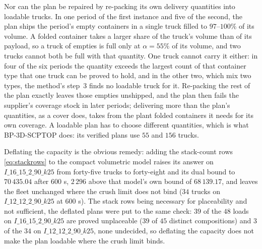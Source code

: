 Nor can the plan be repaired by re-packing its own delivery quantities
into loadable trucks. In one period of the first instance and five of
the second, the plan ships the period's empty containers in a single
truck filled to $97$--$100\%$ of its volume. A folded container takes a
larger share of the truck's volume than of its payload, so a truck of
empties is full only at $\alpha = 55\%$ of its volume, and two trucks
cannot both be full with that quantity. One truck cannot carry it either: in
four of the six periods the quantity exceeds the largest count of that
container type that one truck can be proved to hold, and in the other
two, which mix two types, the method's step~3 finds no loadable truck
for it. Re-packing the rest of the plan exactly leaves those empties
unshipped, and the plan then fails the supplier's coverage stock in
later periods; delivering more than the plan's quantities, as a cover
does, takes from the plant folded containers it needs for its own
coverage. A loadable plan has to choose different quantities, which is
what BP-3D-SCPTOP does: its verified plans use $55$ and $156$ trucks.

Deflating the capacity is the obvious remedy: adding the stack-count
rows \eqref{eq:stackrows} to the compact volumetric model raises its
answer on $I\_16\_15\_2\_90\_k25$ from forty-five trucks to forty-eight
and its dual bound to $70\,435.04$ after $600$ s, $2\,296$ above that
model's own bound of $68\,139.17$, and leaves the fleet unchanged where
the crush limit does not bind ($34$ trucks on $I\_12\_12\_2\_90\_k25$ at
$600$ s).
The stack rows being necessary for placeability and not sufficient,
the deflated plans were put to the same check: $39$ of the $48$ loads
on $I\_16\_15\_2\_90\_k25$ are proved unplaceable ($39$ of $45$
distinct compositions) and $3$ of the $34$ on $I\_12\_12\_2\_90\_k25$,
none undecided, so deflating the capacity does not make the plan
loadable where the crush limit binds.

